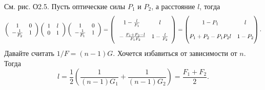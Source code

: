 См. рис. О2.5. Пусть оптические силы $P_1$ и $P_2$, а расстояние $l$, тогда
\begin{equation*}
    \left(
        \begin{array}{cc}
         1 & 0 \\
         -\frac{1}{F_2} & 1 \\
        \end{array}
    \right)
    \left(
        \begin{array}{cc}
         1 & l \\
         0 & 1 \\
        \end{array}
    \right)
    \left(
        \begin{array}{cc}
         1 & 0 \\
         -\frac{1}{F_1} & 1 \\
        \end{array}
    \right) = 
    \left(
    \begin{array}{cc}
    \vphantom{\bigg|}
         1-\frac{l}{F_1} & l \\
     \vphantom{\bigg|}
         -\frac{F_1+F_2-l}{F_1 F_2} & 1-\frac{l}{F_2} \\
    \end{array}
    \right) = \begin{pmatrix}
        \vphantom{\bigg|}
        1-P_1 & l \\
        \vphantom{\bigg|}
        P_1 + P_2 - P_1 P_2 l & 1 - P_2 \\
    \end{pmatrix}.
\end{equation*}
Давайте считать $1/F = (n-1) G$. Хочется избавиться от зависимости от $n$. Тогда
\begin{equation*}
    l = \frac{1}{2} \left(
        \frac{1}{(n-1)G_1} + \frac{1}{(n-1) G_2}
    \right) = \frac{F_1 + F_2}{2}.
\end{equation*}


